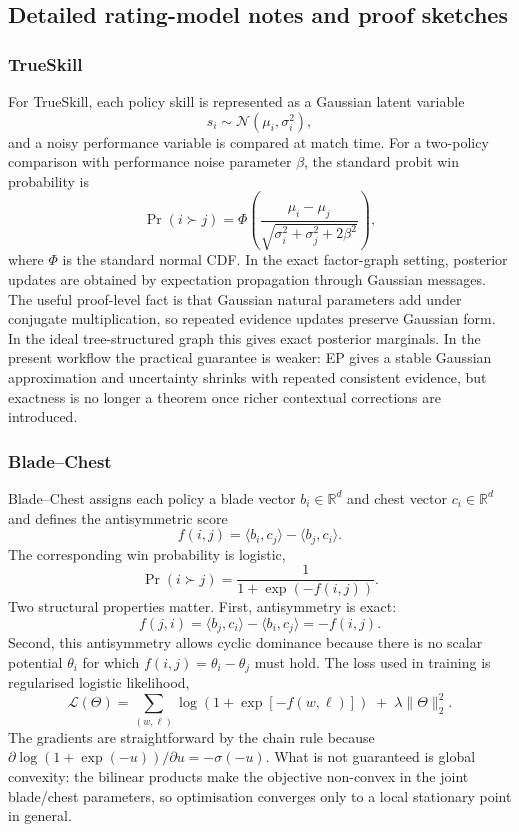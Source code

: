 \documentclass[twoside,twocolumn,9pt]{article}
\begin{document}
\subsection{Detailed rating-model notes and proof sketches}

\subsubsection{TrueSkill}

For TrueSkill, each policy skill is represented as a Gaussian latent variable
\[
s_i \sim \mathcal{N}(\mu_i,\sigma_i^2),
\]
and a noisy performance variable is compared at match time. For a two-policy comparison with performance noise parameter $\beta$, the standard probit win probability is
\[
\Pr(i \succ j)=\Phi\!\left(
\frac{\mu_i-\mu_j}{\sqrt{\sigma_i^2+\sigma_j^2+2\beta^2}}
\right),
\]
where $\Phi$ is the standard normal CDF.\cite{Herbrich2006TrueSkill,Minka2001EP} In the exact factor-graph setting, posterior updates are obtained by expectation propagation through Gaussian messages. The useful proof-level fact is that Gaussian natural parameters add under conjugate multiplication, so repeated evidence updates preserve Gaussian form. In the ideal tree-structured graph this gives exact posterior marginals. In the present workflow the practical guarantee is weaker: EP gives a stable Gaussian approximation and uncertainty shrinks with repeated consistent evidence, but exactness is no longer a theorem once richer contextual corrections are introduced.

\subsubsection{Blade--Chest}

Blade--Chest assigns each policy a blade vector $b_i\in\mathbb{R}^d$ and chest vector $c_i\in\mathbb{R}^d$ and defines the antisymmetric score
\[
f(i,j)=\langle b_i,c_j\rangle-\langle b_j,c_i\rangle.
\]
The corresponding win probability is logistic,
\[
\Pr(i\succ j)=\frac{1}{1+\exp(-f(i,j))}.
\]
Two structural properties matter. First, antisymmetry is exact:
\[
f(j,i)=\langle b_j,c_i\rangle-\langle b_i,c_j\rangle=-f(i,j).
\]
Second, this antisymmetry allows cyclic dominance because there is no scalar potential $\theta_i$ for which $f(i,j)=\theta_i-\theta_j$ must hold. The loss used in training is regularised logistic likelihood,
\[
\mathcal{L}(\Theta)=
\sum_{(w,\ell)}
\log\!\left(1+\exp\!\left[-f(w,\ell)\right]\right)
\;+\;
\lambda \|\Theta\|_2^2.
\]
The gradients are straightforward by the chain rule because $\partial \log(1+\exp(-u))/\partial u=-\sigma(-u)$. What is not guaranteed is global convexity: the bilinear products make the objective non-convex in the joint blade/chest parameters, so optimisation converges only to a local stationary point in general.
\end{document}
